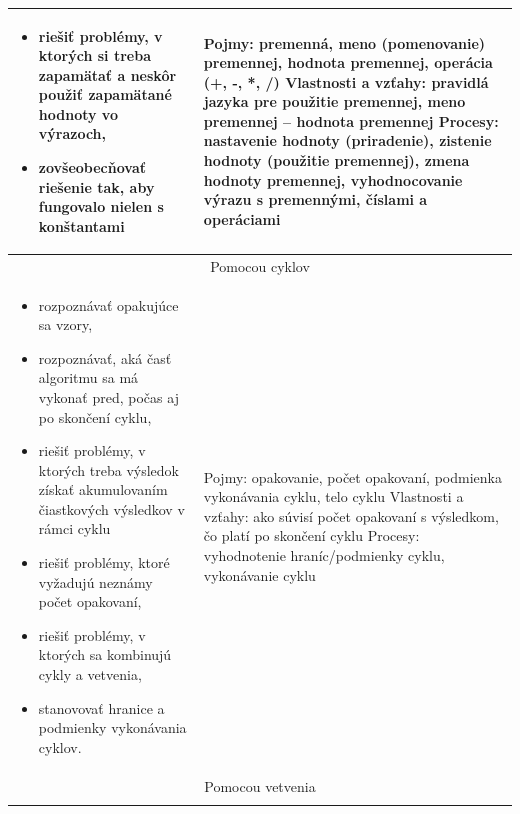 \documentclass[FP,DP]{tulthesis}
\begin{document}
{{{{{{\begin{table}[t]
\begin{tabular}{|l|l|}
\begin{minipage}[t]{0.45\textwidth}
\begin{itemize}[leftmargin=*,nosep]
	\item riešiť problémy, v ktorých si treba zapamätať a neskôr použiť
zapamätané hodnoty vo výrazoch,
\item zovšeobecňovať riešenie tak, aby fungovalo nielen s konštantami
\end{itemize}
  \end{minipage} &
  \begin{minipage}[t]{0.45\textwidth}
Pojmy: premenná, meno (pomenovanie) premennej, hodnota premennej,
operácia (+, -, *, /)
Vlastnosti a vzťahy: pravidlá jazyka pre použitie premennej, meno premennej
– hodnota premennej
Procesy: nastavenie hodnoty (priradenie), zistenie hodnoty (použitie
premennej), zmena hodnoty premennej, vyhodnocovanie výrazu
s premennými, číslami a operáciami
  \end{minipage}\\\hline
\multicolumn{2}{|c|}{Pomocou cyklov}\\\hline
\begin{minipage}[t]{0.45\textwidth}
\begin{itemize}[leftmargin=*,nosep]
  	\item rozpoznávať opakujúce sa vzory,
	\item rozpoznávať, aká časť algoritmu sa má vykonať pred, počas aj po
skončení cyklu,
\item riešiť problémy, v ktorých treba výsledok získať akumulovaním
čiastkových výsledkov v rámci cyklu
\item riešiť problémy, ktoré vyžadujú neznámy počet opakovaní,
\item riešiť problémy, v ktorých sa kombinujú cykly a vetvenia,
\item stanovovať hranice a podmienky vykonávania cyklov.
\end{itemize}
  \end{minipage} &
  \begin{minipage}[t]{0.45\textwidth}
Pojmy: opakovanie, počet opakovaní, podmienka vykonávania cyklu,
telo cyklu
Vlastnosti a vzťahy: ako súvisí počet opakovaní s výsledkom, čo platí
po skončení cyklu
Procesy: vyhodnotenie hraníc/podmienky cyklu, vykonávanie cyklu
  \end{minipage}\\\hline
\multicolumn{2}{|c|}{Pomocou vetvenia}\\\hline
\begin{minipage}[t]{0.45\textwidth}
\begin{itemize}[leftmargin=*,nosep]

\end{itemize}
\end{minipage}
\end{tabular}
\end{table}}}}}}}
\end{document}
